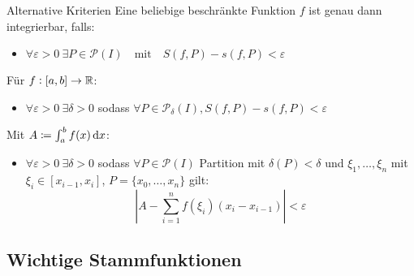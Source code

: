 \begin{theorem}{Alternative Kriterien}
    Eine beliebige beschränkte Funktion $f$ ist genau dann integrierbar, falls:
    \begin{itemize}
         \item $\forall \varepsilon > 0 ~ \exists P \in \mathcal{P}(I) \quad \text{mit} \quad S(f,P) - s(f,P) < \varepsilon$
    \end{itemize}

    Für $f : [a,b] \to \mathbb{R}$:
    \begin{itemize}
         \item $\forall \varepsilon > 0 ~\exists \delta > 0$ sodass
    $\forall P \in \mathcal{P}_\delta (I), S(f,P) - s(f,P) < \varepsilon$
     \end{itemize}

    Mit $A \coloneqq \int_a^b f(x) \dif x$:
    \begin{itemize}
        \item $\forall \varepsilon > 0 ~ \exists \delta > 0$ sodass $\forall P \in \mathcal{P} (I)$ Partition mit $\delta(P) < \delta$ und $\xi_1 , \ldots , \xi_n$ mit $\xi_i \in [x_{i-1},x_i]$, $P = \{x_0 , \ldots , x_n\}$ gilt:
        $$\left| A - \sum_{i=1}^n f(\xi_i) (x_i - x_{i-1})\right| < \varepsilon$$
    \end{itemize}
\end{theorem}

\subsection{Wichtige Stammfunktionen}

